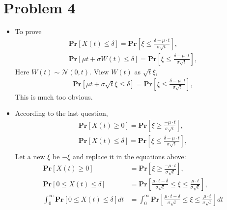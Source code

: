 \documentclass{article}
\theoremstyle{definition}
\begin{document}
	\section*{Problem 4}
	\begin{itemize}
		\item To prove
		\begin{equation}
			\begin{aligned}
				\mathbf{Pr}[X(t)\leq\delta] = \mathbf{Pr}\left[\xi\leq\frac{\delta-\mu\cdot t}{\sigma \sqrt{t}}\right], \\
				\mathbf{Pr}[\mu t+\sigma W(t)\leq\delta] = \mathbf{Pr}\left[\xi\leq\frac{\delta-\mu\cdot t}{\sigma \sqrt{t}}\right],
			\end{aligned}
		\end{equation}
		Here $W(t)\sim \mathcal N(0, t)$. View $W(t)$ as $\sqrt{t}\xi$, 
		\begin{equation}
			\begin{aligned}
				\mathbf{Pr}[\mu t+\sigma\sqrt{t} \xi\leq\delta] = \mathbf{Pr}\left[\xi\leq\frac{\delta-\mu\cdot t}{\sigma \sqrt{t}}\right],
			\end{aligned}
		\end{equation}
		This is much too obvious.
		\item According to the last question, 
		\begin{equation}
			\begin{aligned}
				\mathbf{Pr}[X(t)\geq0] = \mathbf{Pr}\left[\xi\geq\frac{-\mu\cdot t}{\sigma \sqrt{t}}\right],\\
				\mathbf{Pr}[X(t)\leq\delta] = \mathbf{Pr}\left[\xi\leq\frac{\delta-\mu\cdot t}{\sigma \sqrt{t}}\right], \\
			\end{aligned}
		\end{equation}
		Let a new $\xi$ be $-\xi$ and replace it in the equations above:
		\begin{equation}
			\begin{aligned}
				\mathbf{Pr}[X(t)\geq0] &= \mathbf{Pr}\left[\xi\geq\frac{-\mu\cdot t}{\sigma \sqrt{t}}\right],\\
				\mathbf{Pr}[0\leq X(t)\leq\delta] &= \mathbf{Pr}\left[\frac{\mu\cdot t-\delta}{\sigma \sqrt{t}}\leq\xi\leq\frac{\mu\cdot t}{\sigma \sqrt{t}} \right], \\
				\int_0^\infty\mathbf{Pr}[0\leq X(t)\leq\delta]dt &= \int_0^\infty\mathbf{Pr}\left[\frac{\mu\cdot t-\delta}{\sigma \sqrt{t}}\leq\xi\leq\frac{\mu\cdot t}{\sigma \sqrt{t}} \right]dt \\

\end{aligned}
\end{equation}
\end{itemize}
\end{document}
